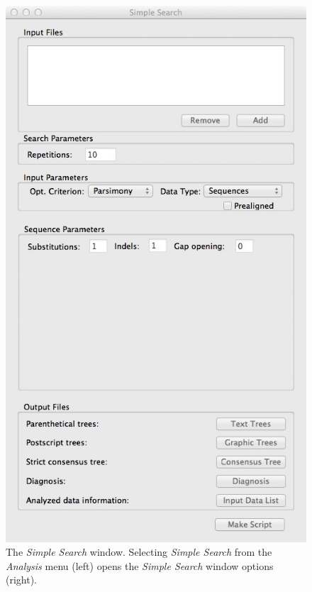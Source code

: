 \begin{figure}
\begin{minipage}[c]{0.52\textwidth}
	   	\includegraphics[width=\textwidth]{doc/figures/simplesearch_window.jpg}
   	\end{minipage}
	
\caption{The \emph{Simple Search} window. Selecting \emph{Simple Search} from the \emph{Analysis} menu (left) 
opens the \emph{Simple Search} window options (right).}
\label{fig:simple_search_window}
\end{figure}


